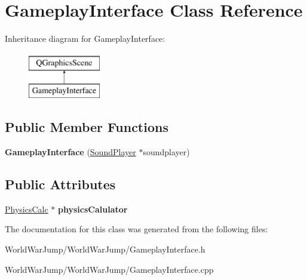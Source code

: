 \hypertarget{class_gameplay_interface}{}\section{Gameplay\+Interface Class Reference}
\label{class_gameplay_interface}
Inheritance diagram for Gameplay\+Interface\+:\begin{figure}[H]
\begin{center}
\leavevmode
\includegraphics[height=2.000000cm]{class_gameplay_interface}
\end{center}
\end{figure}
\subsection*{Public Member Functions}
\begin{DoxyCompactItemize}
\item 
{\bfseries Gameplay\+Interface} (\hyperlink{class_sound_player}{Sound\+Player} $\ast$soundplayer)\hypertarget{class_gameplay_interface_ab75b8894a36f5697edc87e0acc2d31ce}{}\label{class_gameplay_interface_ab75b8894a36f5697edc87e0acc2d31ce}

\end{DoxyCompactItemize}
\subsection*{Public Attributes}
\begin{DoxyCompactItemize}
\item 
\hyperlink{class_physics_calc}{Physics\+Calc} $\ast$ {\bfseries physics\+Calulator}\hypertarget{class_gameplay_interface_adf09add3928dd254e051c3ecc070bee6}{}\label{class_gameplay_interface_adf09add3928dd254e051c3ecc070bee6}

\end{DoxyCompactItemize}


The documentation for this class was generated from the following files\+:\begin{DoxyCompactItemize}
\item 
World\+War\+Jump/\+World\+War\+Jump/Gameplay\+Interface.\+h\item 
World\+War\+Jump/\+World\+War\+Jump/Gameplay\+Interface.\+cpp\end{DoxyCompactItemize}
